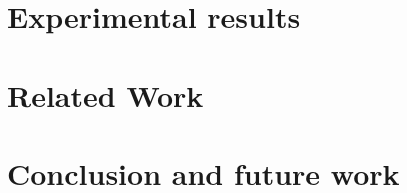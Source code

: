 \documentclass[smallcondensed]{svjour3}     %
\begin{document}
\section{Experimental results}
\label{sec:experiments}


\section{Related Work}
\label{sec:related}


\section{Conclusion and future work}
\label{sec:conclusion}



\end{document}
